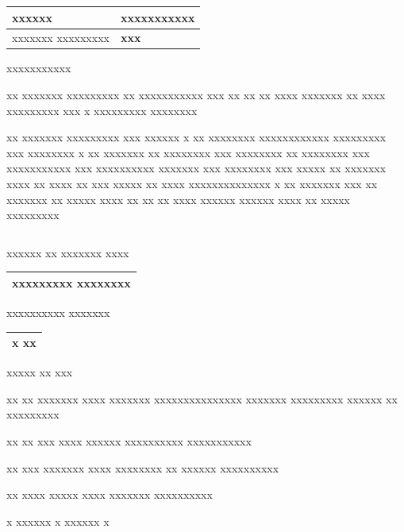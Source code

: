 \documentclass[11pt,a4paper]{article}
\begin{document}
\begin{table}[h]
\begin{tabular}{|l|l|}
\hline
xxxxxx & xxxxxxxxxxx \\ \hline
xxxxxxx xxxxxxxxx & \textbf{xxx} \\ \hline
\end{tabular}
\end{table}

xxxxxxxxxxx

xx xxxxxxx xxxxxxxxx xx xxxxxxxxxxx xxx xx xx xx xxxx xxxxxxx xx xxxx xxxxxxxxx xxx x xxxxxxxxx xxxxxxxx

xx xxxxxxx xxxxxxxxx xxx xxxxxx x xx xxxxxxxx xxxxxxxxxxxx xxxxxxxxx xxx xxxxxxxx x xx xxxxxxx xx xxxxxxxx xxx xxxxxxxx xx xxxxxxxx xxx xxxxxxxxxxx xxx xxxxxxxxxx xxxxxxx xxx xxxxxxxx xxx xxxxx xx xxxxxxx xxxx xx xxxx xx xxx xxxxx xx xxxx xxxxxxxxxxxxxx x xx xxxxxxx xxx xx xxxxxxx xx xxxxx xxxx xx xx xx xxxx xxxxxx xxxxxx xxxx xx xxxxx xxxxxxxxx

\begin{table}[h]
\begin{tabular}{|l|}
\hline
 \\ \hline
\end{tabular}
\end{table}

xxxxxx xx xxxxxxx xxxx

\begin{table}[h]
\begin{tabular}{|l|}
\hline
xxxxxxxxx xxxxxxxx \\ \hline
\end{tabular}
\end{table}

xxxxxxxxxx xxxxxxx

\begin{table}[h]
\begin{tabular}{|l|}
\hline
x   xx \\ \hline
\end{tabular}
\end{table}

xxxxx xx xxx

xx xx xxxxxxx xxxx xxxxxxx xxxxxxxxxxxxxxx xxxxxxx xxxxxxxxx xxxxxx xx xxxxxxxxx

xx xx xxx xxxx xxxxxx xxxxxxxxxx xxxxxxxxxxx

xx xxx xxxxxxx xxxx xxxxxxxx xx xxxxxx xxxxxxxxxx

xx xxxx xxxxx xxxx xxxxxxx xxxxxxxxxx

x xxxxxx x xxxxxx x
\end{document}
